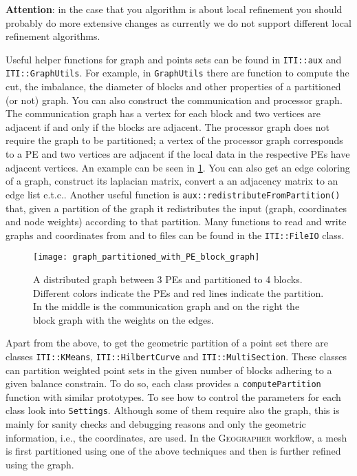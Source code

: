 \documentclass[a4paper,10pt]{article}
\newcommand{\geo}{\textsc{Geographer} }
\newcommand{\etc}{e.t.c.}
\newcommand{\att}{\textbf{Attention}: }
\newcommand{\MI}[1]{\texttt{#1}}
\begin{document}
\att in the case that you algorithm is about local refinement you should probably do more extensive
changes as currently we do not support different local refinement algorithms.

Useful helper functions for graph and points sets can be found in \MI{ITI::aux}
and \MI{ITI::GraphUtils}. For example, in \MI{GraphUtils} there are function to compute the cut, the imbalance,
the diameter of blocks and other properties of a partitioned (or not) graph. You can also construct the 
communication and processor graph. The communication graph has a vertex for each block and two vertices
are adjacent if and only if the blocks are adjacent. The processor graph does not require the graph
to be partitioned; a vertex of the processor graph corresponds to a PE and two vertices are adjacent 
if the local data in the respective PEs have adjacent vertices. An example can be seen in
\cref{fig:part_graph}. You can also get an edge coloring of a graph,
construct its laplacian matrix, convert a an adjacency matrix to an edge list \etc.
Another useful function is \MI{aux::redistributeFromPartition()} that, given a partition of the graph 
it redistributes the input (graph, coordinates and node weights) according to that partition.
Many functions to read and write graphs and coordinates from and to files can be found
in the \MI{ITI::FileIO} class.

\begin{figure}[h]
\centering
\texttt{[image: graph\_partitioned\_with\_PE\_block\_graph]}
\caption{A distributed graph between 3 PEs and partitioned to 4 blocks. Different colors indicate the PEs
and red lines indicate the partition. In the middle is the communication graph and on the right the
block graph with the weights on the edges.}
\label{fig:part_graph}
\end{figure}

Apart from the above, to get the geometric partition of a point set there are classes \MI{ITI::KMeans},
\MI{ITI::HilbertCurve} and \MI{ITI::MultiSection}. These classes can partition weighted point sets in the given
number of blocks adhering to a given balance constrain. To do so, each class provides a 
\MI{computePartition} function with similar prototypes. To see how to control the parameters for
each class look into \MI{Settings}. Although some of them require also the
graph, this is mainly for sanity checks and debugging reasons and only the geometric information,
i.e., the coordinates,
are used. In the \geo workflow, a mesh is first partitioned using one of the above techniques and
then is further refined using the graph.
\end{document}
